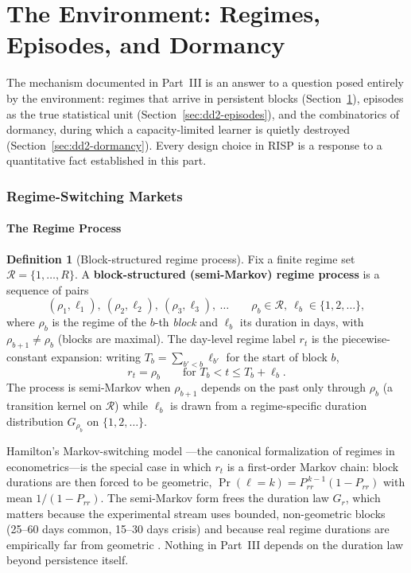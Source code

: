 \documentclass[11pt,a4paper]{article}
\theoremstyle{definition}
\newtheorem{definition}{Definition}[section]
\theoremstyle{plain}
\newcommand{\nm}{\textsc{RISP}}
\begin{document}
\part{The Environment: Regimes, Episodes, and Dormancy}
\label{sec:dd2-part-env}

The mechanism documented in Part~III is an answer to a question posed
entirely by the environment: regimes that arrive in persistent blocks
(Section~\ref{sec:dd2-regimes}), episodes as the true statistical unit
(Section~\ref{sec:dd2-episodes}), and the combinatorics of dormancy, during
which a capacity-limited learner is quietly destroyed
(Section~\ref{sec:dd2-dormancy}). Every design choice in \nm{} is a response
to a quantitative fact established in this part.

\section{Regime-Switching Markets}
\label{sec:dd2-regimes}

\subsection{The Regime Process}

\begin{definition}[Block-structured regime process]
\label{def:dd2-regime-process}
Fix a finite regime set $\mathcal{R} = \{1, \ldots, R\}$. A
\textbf{block-structured (semi-Markov) regime process} is a sequence of pairs
\[
(\rho_1, \ell_1),\ (\rho_2, \ell_2),\ (\rho_3, \ell_3),\ \ldots
\qquad \rho_b \in \mathcal{R},\ \ell_b \in \{1, 2, \ldots\},
\]
where $\rho_b$ is the regime of the $b$-th \emph{block} and $\ell_b$ its
duration in days, with $\rho_{b+1} \neq \rho_b$ (blocks are maximal). The
day-level regime label $r_t$ is the piecewise-constant expansion: writing
$T_b = \sum_{b' < b} \ell_{b'}$ for the start of block $b$,
\begin{equation}
\label{eq:dd2-semimarkov}
r_t = \rho_b \qquad \text{for } T_b < t \le T_b + \ell_b .
\end{equation}
The process is semi-Markov when $\rho_{b+1}$ depends on the past only through
$\rho_b$ (a transition kernel on $\mathcal{R}$) while $\ell_b$ is drawn from a
regime-specific duration distribution $G_{\rho_b}$ on $\{1,2,\ldots\}$.
\end{definition}

Hamilton's Markov-switching model \citep{hamilton1989new}---the canonical
formalization of regimes in econometrics---is the special case in which $r_t$
is a first-order Markov chain: block durations are then forced to be
geometric, $\Pr(\ell = k) = P_{rr}^{\,k-1}(1 - P_{rr})$ with mean
$1/(1 - P_{rr})$. The semi-Markov form frees the duration law $G_r$, which
matters because the experimental stream uses bounded, non-geometric blocks
(25--60 days common, 15--30 days crisis) and because real regime durations
are empirically far from geometric \citep{ang2012regime, guidolin2007asset}.
Nothing in Part~III depends on the duration law beyond persistence itself.
\end{document}
